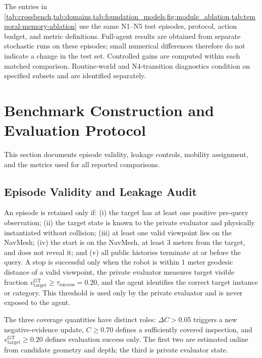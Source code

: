 The \evolvingworldbench{} entries in
\cref{tab:crossbench,tab:domains,tab:foundation_models,fig:module_ablation,tab:temporal-memory-ablation}
use the same N1--N5 test episodes, protocol, action budget, and metric
definitions. Full-agent results are obtained from separate stochastic runs on these
episodes; small numerical differences therefore do not indicate a
change in the test set. Controlled gains are computed within each matched
comparison. Routine-world and N4-transition diagnostics condition on specified
subsets and are identified separately.

\section{Benchmark Construction and Evaluation Protocol}
\label{app:benchmark-protocol}

This section documents episode validity, leakage controls, mobility assignment,
and the metrics used for all reported comparisons.



\subsection{Episode Validity and Leakage Audit}
\label{app:audit}

An episode is retained only if: (i) the target has at least one positive
pre-query observation; (ii) the target state is known to the private evaluator
and physically instantiated without collision; (iii) at least one valid
viewpoint lies on the NavMesh; (iv) the start is on the NavMesh, at least
$3$ meters from the target, and does not reveal it; and (v) all public histories
terminate at or before the query. A stop is successful only when the robot is
within $1$ meter geodesic distance of a valid viewpoint, the private evaluator
measures target visible fraction
$v_{\mathrm{target}}^{\mathrm{GT}}\geq\tau_{\mathrm{success}}=0.20$, and the
agent identifies the correct target instance or category. This threshold is
used only by the private evaluator and is never exposed to the agent.

The three coverage quantities have distinct roles:
$\Delta C>0.05$ triggers a new negative-evidence update,
$C\geq0.70$ defines a sufficiently covered inspection, and
$v_{\mathrm{target}}^{\mathrm{GT}}\geq0.20$ defines evaluation success only.
The first two are estimated online from candidate geometry and depth; the third
is private evaluator state.

